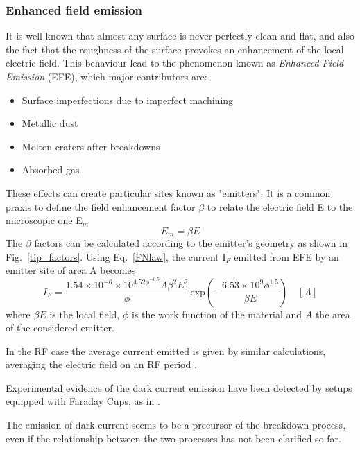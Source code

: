 \subsubsection{Enhanced field emission}

It is well known that almost any surface is never perfectly clean and flat, and also the fact that the roughness of the surface provokes an enhancement of the local electric field. This behaviour lead to the phenomenon known as \textit{Enhanced Field Emission} (EFE), which major contributors are:
\begin{itemize}
\item Surface imperfections due to imperfect machining
\item Metallic dust
\item Molten craters after breakdowns
\item Absorbed gas
\end{itemize} 
These effects can create particular sites known as "emitters". It is a common praxis to define the field enhancement factor $\beta$ to relate the electric field E to the microscopic one E$_m$
\begin{equation}
E_{m} = \beta E
\end{equation}
The $\beta$ factors can be calculated according to the emitter's geometry \cite{Rohrbach:190223} as shown in Fig.~\ref{tip_factors}.
Using Eq.~\ref{FNlaw}, the current I$_F$ emitted from EFE by an emitter site of area A becomes 
\begin{equation}
I_F = \frac{ 1.54\times10^{-6} \times 10^{4.52\phi^{-0.5}} A \beta^2 E^2}{  \phi } \, \text{exp} \left ( -\frac{6.53\times 10^9 \phi^{1.5}}{\beta E} \right ) \quad [A]  \label{If}
\end{equation}
where $\beta E$ is the local field, $\phi$ is the work function of the material and $A$ the area of the considered emitter.

 In the RF case the average current emitted is given by similar calculations, averaging the electric field on an RF period  \cite{Wang:1997ip}. 

Experimental evidence of the dark current emission have been detected by setups equipped with Faraday Cups, as in \cite{Wuensch:advaces}.

The emission of dark current seems to be a precursor of the breakdown  process, even if the relationship between the two processes has not been clarified so far.

